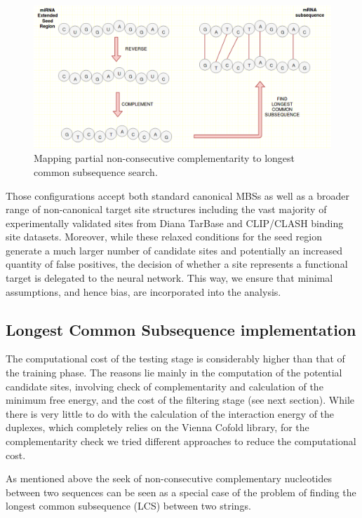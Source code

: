 \begin{figure}[hbt!]
	\centering
	\includegraphics[width=1\textwidth]{Figures/lcs}
	\caption{Mapping partial non-consecutive complementarity to longest common subsequence search.}
	\label{fig:lcs}
\end{figure}

Those configurations accept both standard canonical MBSs as well as a broader
range of non-canonical target site structures including the vast majority of experimentally validated sites from Diana TarBase and CLIP/CLASH binding site
datasets. Moreover, while these relaxed conditions for the seed region generate a much larger number of candidate sites and potentially an increased quantity of false positives, the decision of whether a site represents a functional target is delegated to the neural network. This way, we ensure that minimal assumptions, and hence bias, are incorporated into the analysis. 

\subsection{Longest Common Subsequence implementation}
The computational cost of the testing stage is considerably higher than that of the  training phase. The reasons lie mainly in the computation of the potential candidate sites, involving check of complementarity and calculation of the minimum free energy, and the cost of the filtering stage (see next section).    
While there is very little to do with the calculation of the interaction energy of the duplexes, which completely relies on the Vienna Cofold library, for the complementarity check we tried different approaches to reduce the computational cost.

As mentioned above the seek of non-consecutive complementary nucleotides between two sequences can be seen as a special case of the problem of finding the longest common subsequence (LCS) between two strings. 

